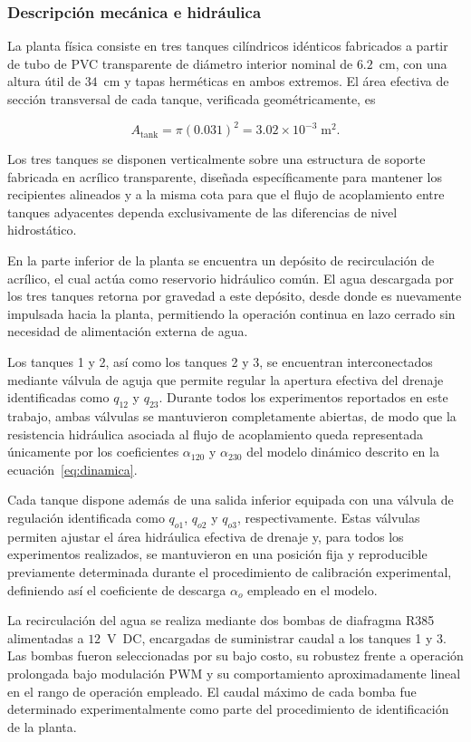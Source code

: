 \documentclass[12pt,letterpaper]{article}
\begin{document}
\subsubsection{Descripción mecánica e hidráulica}

La planta física consiste en tres tanques cilíndricos idénticos
fabricados a partir de tubo de PVC transparente de diámetro interior
nominal de $6.2$~cm, con una altura útil de $34$~cm y tapas herméticas
en ambos extremos. El área efectiva de sección transversal de cada
tanque, verificada geométricamente, es

\[
A_{\mathrm{tank}}=\pi(0.031)^2=3.02\times10^{-3}\;\mathrm{m}^2.
\]

Los tres tanques se disponen verticalmente sobre una estructura de soporte fabricada en acrílico transparente, diseñada específicamente para mantener los recipientes alineados y a la misma cota para que el flujo de acoplamiento entre tanques adyacentes
dependa exclusivamente de las diferencias de nivel hidrostático.

En la parte inferior de la planta se encuentra un depósito de
recirculación de acrílico, el cual actúa como reservorio hidráulico
común. El agua descargada por los tres tanques retorna por gravedad a
este depósito, desde donde es nuevamente impulsada hacia la planta,
permitiendo la operación continua en lazo cerrado sin necesidad de
alimentación externa de agua.

Los tanques 1 y 2, así como los tanques 2 y 3, se encuentran
interconectados mediante válvula de aguja que permite regular la apertura efectiva del drenaje identificadas como $q_{12}$ y $q_{23}$. Durante todos los experimentos
reportados en este trabajo, ambas válvulas se mantuvieron completamente
abiertas, de modo que la resistencia hidráulica asociada al flujo de
acoplamiento queda representada únicamente por los coeficientes
$\alpha_{120}$ y $\alpha_{230}$ del modelo dinámico descrito en la
ecuación~\eqref{eq:dinamica}.

Cada tanque dispone además de una salida inferior equipada con una
válvula de regulación identificada como $q_{o1}$, $q_{o2}$ y $q_{o3}$,
respectivamente. Estas válvulas permiten ajustar el área hidráulica
efectiva de drenaje y, para todos los experimentos realizados, se
mantuvieron en una posición fija y reproducible previamente determinada
durante el procedimiento de calibración experimental, definiendo así el
coeficiente de descarga $\alpha_o$ empleado en el modelo.

La recirculación del agua se realiza mediante dos bombas de diafragma
R385 alimentadas a $12$~V~DC, encargadas de suministrar caudal a los
tanques 1 y 3. Las bombas fueron seleccionadas por su bajo costo, su
robustez frente a operación prolongada bajo modulación PWM y su
comportamiento aproximadamente lineal en el rango de operación empleado.
El caudal máximo de cada bomba fue determinado experimentalmente como
parte del procedimiento de identificación de la planta.
\end{document}
